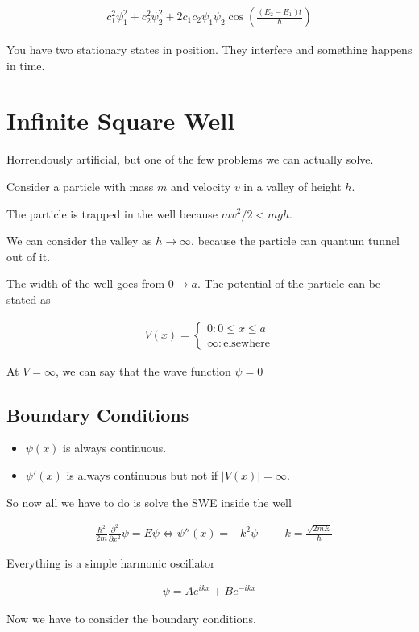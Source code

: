 \documentclass[fleqn]{report}
\newcommand{\hp}{\hspace{1cm}}
\newcommand{\del}{\partial}
\newcommand{\equations} [1] {
\begin{gather*}
#1
\end{gather*}
}
\begin{document}
\equations{
    c_1^2 \psi_1^2 
    +
    c_2^2 \psi_2^2 
    +
    2 c_1 c_2 \psi_1 \psi_2 
    \cos(\frac{(E_2 - E_1) t}{\hbar})
}

You have two stationary states in position. They interfere and something 
happens in time. 

\section{Infinite Square Well}
Horrendously artificial, but one of the few problems we can actually solve. 

Consider a particle with mass $m$ and velocity $v$ in a valley of height 
$h$.

The particle is trapped in the well because $mv^2/2 < mgh$.

We can consider the valley as $h \to \infty$, because the particle can 
quantum tunnel out of it.

The width of the well goes from $0 \to a$. The potential of the 
particle can be stated as 

\equations{
    V(x)
    =
    \begin{cases}
        0: 0 \leq x \leq a 
        \\
        \infty : \textrm{elsewhere}
    \end{cases}
}

At $V = \infty$, we can say that the wave function $\psi = 0$

\subsection{Boundary Conditions}
\begin{itemize}
    \item
    $\psi(x)$ is always continuous.
    \item
    $\psi'(x)$ is always continuous but not if $|V(x)| = \infty$.
\end{itemize}

So now all we have to do is solve the SWE inside the well 
\equations{
    - \frac{\hbar^2}{2m}
    \frac{\del^2}{\del x^2}
    \psi 
    =
    E \psi 
    \iff 
    \psi''(x)
    =
    -k^2 \psi 
    \hp 
    k
    =
    \frac{\sqrt{2mE}}{\hbar}
}

Everything is a simple harmonic oscillator 

\equations{
    \psi=
    A e^{ikx}
    +
    B e^{-ikx}
}

Now we have to consider the boundary conditions. 
\end{document}
